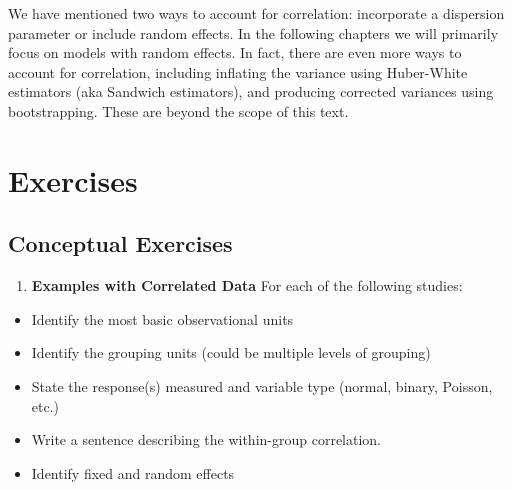 \documentclass[
]{krantz}
\providecommand{\tightlist}{%
  \setlength{\itemsep}{0pt}\setlength{\parskip}{0pt}}
\begin{document}
We have mentioned two ways to account for correlation: incorporate a dispersion parameter or include random effects. In the following chapters we will primarily focus on models with random effects. In fact, there are even more ways to account for correlation, including inflating the variance using Huber-White estimators (aka Sandwich estimators), and producing corrected variances using bootstrapping. These are beyond the scope of this text.

\hypertarget{exercises-6}{%
\section{Exercises}\label{exercises-6}}

\hypertarget{conceptual-exercises-4}{%
\subsection{Conceptual Exercises}\label{conceptual-exercises-4}}

\begin{enumerate}
\def\labelenumi{\arabic{enumi}.}
\tightlist
\item
  \textbf{Examples with Correlated Data} For each of the following studies:
\end{enumerate}

\begin{itemize}
\tightlist
\item
  Identify the most basic observational units\\
\item
  Identify the grouping units (could be multiple levels of grouping)
\item
  State the response(s) measured and variable type (normal, binary, Poisson, etc.)
\item
  Write a sentence describing the within-group correlation.
\item
  Identify fixed and random effects
\end{itemize}
\end{document}
